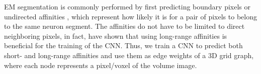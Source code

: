 EM segmentation is commonly performed by first predicting 
boundary pixels \cite{beier2017multicut,ciresan2012deep} or undirected affinities \cite{wolf2018mutex,lee2017superhuman,funke2018large}, which represent how likely it is for a pair of pixels to belong to the same neuron segment. 
The affinities do not have to be limited to direct neighboring pixels, in fact, \cite{lee2017superhuman} have shown that using long-range affinities is beneficial for the training of the CNN. 
Thus, we train a CNN to predict both short- and long-range affinities
and use them as edge weights of a 3D grid graph, where each node represents a pixel/voxel of the volume image. 

